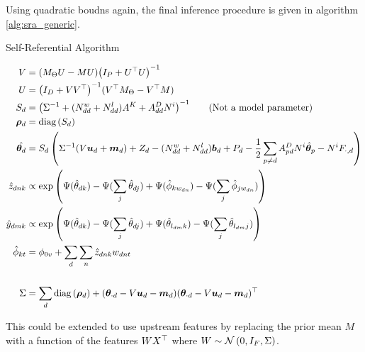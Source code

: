 Using quadratic boudns again, the final inference procedure is given in algorithm \ref{alg:sra_generic}.

\begin{algorithm}
\caption{Self-Referential Algorithm}
\label{alg:sra_generic}
    \begin{align*}
        V & = (M_\Theta U - M U){\left( I_P + U^\top U \right)}^{-1} \\
        U & = {\left( I_D + V V^\top \right)}^{-1}(V^\top M_\Theta - V^\top M) \\
        S_d & = {\left( {\Sigma}^{-1} + (N^w_{dd} + N^l_{dd})A^K + A^D_{dd} N^i \right)}^{-1} \qquad \text{(Not a model parameter)}\\
        \bm \rho_d & = \text{diag} \left( {S_d} \right) \\
        \hat{{ \bm \theta_d }} & = S_d
\left( 
    {\Sigma}^{-1}(V \bm u_d + \bm m_d) + Z_d - (N^w_{dd} + N^l_{dd}) \bm b_d + P_d - \frac{1}{2} \sum_{p \neq d} A^D_{pd} N^i \hat{\bm \theta}_p - N^i F_{\cdot, d}
\right) \\
        \hat{z}_{dnk} & \propto \exp\left(\Psi(\hat{\theta}_{dk}) - \Psi(\sum_j \hat{\theta}_{dj}) + \Psi(\hat{\phi}_{kw_{dn}}) - \Psi(\sum_j \hat{\phi}_{jw_{dn}})\right) \\
        \hat{y}_{dmk} & \propto \exp\left(\Psi(\hat{\theta}_{dk}) - \Psi(\sum_j \hat{\theta}_{dj}) + \Psi(\hat{\theta}_{l_{dm}k}) - \Psi(\sum_j \hat{\theta}_{l_{dm}j})\right) \\
        \hat{\phi}_{kt} & = \phi_{0v} + \sum_d \sum_n \hat{z}_{dnk} w_{dnt} \\
        \qquad & \qquad \\
        \Sigma & = \sum_d \text{diag} \left( {\bm \rho_d} \right) + ({ \bm \theta_{\cdot d} } - V \bm u_d - \bm m_d)({ \bm \theta_{\cdot d} } - V \bm u_d - \bm m_d)^\top
    \end{align*}
\end{algorithm}

This could be extended to use upstream features by replacing the prior mean $M$ with a function of the features $W X^\top$ where $W \sim \mathcal{N} \left(0, I_F, \Sigma\right)$.




